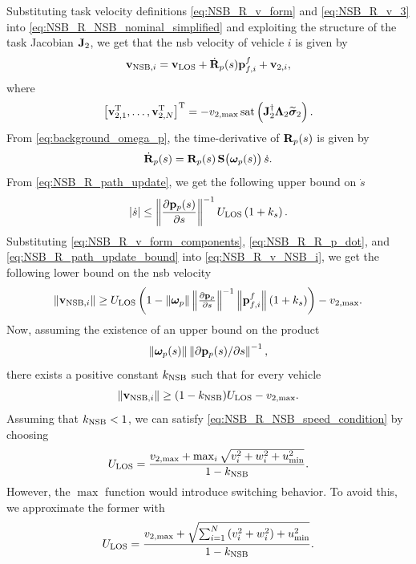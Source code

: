 Substituting task velocity definitions \eqref{eq:NSB_R_v_form} and \eqref{eq:NSB_R_v_3} into \eqref{eq:NSB_R_NSB_nominal_simplified} and exploiting the structure of the task Jacobian $\mathbf{J}_2$, we get that the \gls{nsb} velocity of vehicle $i$ is given by 
\begin{equation}
    \ivel_{{\rm NSB}, i} = \ivel_{\rm LOS} + \dot{\mat{R}}_p(s)\mat{p}_{f,i}^f + \ivel_{2,i}, \label{eq:NSB_R_v_NSB_i}
    \vspace*{-0.55em}
\end{equation}
where 
\begin{equation}
    \left[\mathbf{v}_{2, 1}^{\mathrm{T}}, \ldots, \mathbf{v}_{2, N}^{\mathrm{T}}\right]^{\mathrm{T}} = 
    - v_{2, \max}\,{\rm sat}\left(\mathbf{J}_2^{\dagger}\bm{\Lambda}_2 \widetilde{\bm{\sigma}}_2\right). \label{eq:NSB_R_v_form_components}
\end{equation}
From \eqref{eq:background_omega_p}, the time-derivative of $\mathbf{R}_p(s)$ is given by
\begin{equation}
    \dot{\mathbf{R}}_p(s) = \mathbf{R}_p(s)\,\mathbf{S}\bigl(\bm{\omega}_p(s)\bigr)\,\dot{s}. \label{eq:NSB_R_R_p_dot}
\end{equation}
From \eqref{eq:NSB_R_path_update}, we get the following upper bound on $\dot{s}$
\begin{equation}
    \left|\dot{s}\right| \leq \left\|\frac{\partial \mathbf{p}_p(s)}{\partial s}\right\|^{-1} U_{\rm LOS} \left(1 + k_{s}\right). \label{eq:NSB_R_path_update_bound}
\end{equation}
Substituting \eqref{eq:NSB_R_v_form_components}, \eqref{eq:NSB_R_R_p_dot}, and \eqref{eq:NSB_R_path_update_bound} into \eqref{eq:NSB_R_v_NSB_i}, we get the following lower bound on the \gls{nsb} velocity 
\begin{equation}
    \norm{\ivel_{{\rm NSB}, i}} \geq U_{\rm LOS} \left(1
        - \norm{\bs{\omega}_p}\norm{\scale[1]{\frac{\partial \mat{p}_p}{\partial s}}}^{-1}\norm{\mat{p}_{f, i}^f} \left(1 + k_{s}\right)\right) - \ivels_{2, \max}.
\end{equation}
Now, assuming the existence of an upper bound on the product $$\left\|\bm{\omega}_p(s)\right\|\left\|\partial \mathbf{p}_p(s) / \partial s\right\|^{-1},$$ there exists a positive constant $k_{\rm NSB}$ such that for every vehicle 
\begin{equation}
    \left\|\mathbf{v}_{{\rm NSB}, i}\right\| \geq (1 - k_{\rm NSB})U_{\rm LOS} - v_{2, \max}.
\end{equation}
Assuming that $k_{\rm NSB} < 1$, we can satisfy \eqref{eq:NSB_R_NSB_speed_condition} by choosing 
\begin{equation}
    U_{\rm LOS} = \frac{v_{2, \max} + \max_i \sqrt{v_i^2 + w_i^2 + u_{\min}^2}}{1 - k_{\rm NSB}}.
\end{equation}
However, the $\max$ function would introduce switching behavior.
To avoid this, we approximate the former with 
\begin{equation}
    U_{\rm LOS} = \frac{v_{2, \max} + \sqrt{\sum_{i=1}^N \left(v_i^2 + w_i^2\right) + u_{\min}^2}}{1 - k_{\rm NSB}}.
    \label{eq:NSB_R_U_LOS}
\end{equation}


